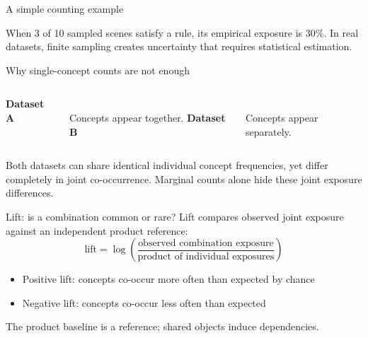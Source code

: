 \documentclass[aspectratio=169,11pt]{beamer}
\newcommand{\captionnote}[1]{{\scriptsize\color{gray}#1}}
\begin{document}
\begin{frame}{A simple counting example}
\begin{center}\end{center}
\vspace{1mm}
\normalsize When 3 of 10 sampled scenes satisfy a rule, its empirical exposure is 30\%. In real datasets, finite sampling creates uncertainty that requires statistical estimation.
\end{frame}

\begin{frame}{Why single-concept counts are not enough}
\begin{columns}
\centering\textbf{Dataset A}\\\vspace{1mm}
\\Concepts appear together.
\centering\textbf{Dataset B}\\\vspace{1mm}
\\Concepts appear separately.
\end{columns}
\vspace{3mm}
\normalsize Both datasets can share identical individual concept frequencies, yet differ completely in joint co-occurrence. Marginal counts alone hide these joint exposure differences.
\end{frame}

\begin{frame}{Lift: is a combination common or rare?}
\normalsize Lift compares observed joint exposure against an independent product reference:
\[\text{lift} = \log\!\left(\frac{\text{observed combination exposure}}{\text{product of individual exposures}}\right)\]
\begin{itemize}
\item Positive lift: concepts co-occur more often than expected by chance
\item Negative lift: concepts co-occur less often than expected
\end{itemize}
\captionnote{The product baseline is a reference; shared objects induce dependencies.}
\end{frame}
\end{document}
